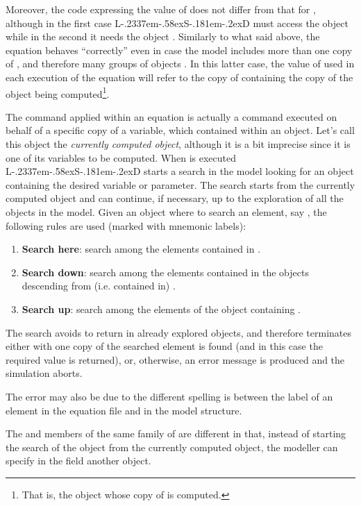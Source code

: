 \documentclass [11pt,a4paper] {book}
\def\LsD{{L\kern-.2337em\lower-.58ex\hbox{S}\kern-.181em\lower-.2ex\hbox{D}}\xspace}
\begin{document}
Moreover, the code expressing the value of  does not differ from that for
, although in the first case \LsD must access the object 
while in the second it needs the object . Similarly to what said above, the
equation behaves ``correctly'' even in case the model includes more than one copy of
, and therefore many groups of objects . In this latter case, the
value of  used in each execution of the equation will refer to the copy of
 containing the copy of the object being computed\footnote{That is, the
object whose copy of  \footnotesize is computed.}.

The command  applied within an equation is actually a command executed on behalf of
a specific copy of a variable, which contained within an object. Let's call this object
the \textit{currently computed object}, although it is a bit imprecise since it is one of
its variables to be computed. When  is executed \LsD starts a search in the
model looking for an object containing the desired variable or parameter. The search
starts from the currently computed object and can continue, if necessary, up to the
exploration of all the objects in the model. Given an object where to search an element,
say  , the following rules are used (marked with mnemonic labels):

\begin{enumerate}
  \item \textbf{Search here}: search among the elements contained in .
  \item \textbf{Search down}: search among the elements contained in the objects descending from (i.e. contained in)
  .
   \item \textbf{Search up}: search among the elements of the object containing .
\end{enumerate}

The search avoids to return in already explored objects, and therefore terminates either with one copy of the searched element is found (and in this case the required value is returned), or, otherwise, an error
message is produced and the simulation aborts. 

The error may also be due to the different spelling is between the label of an element in the equation file and in the model structure. 

The  and  members of the same family of
 are different in that, instead of starting the search of the object from
the currently computed object, the modeller can specify in the  field another
object.
\end{document}
